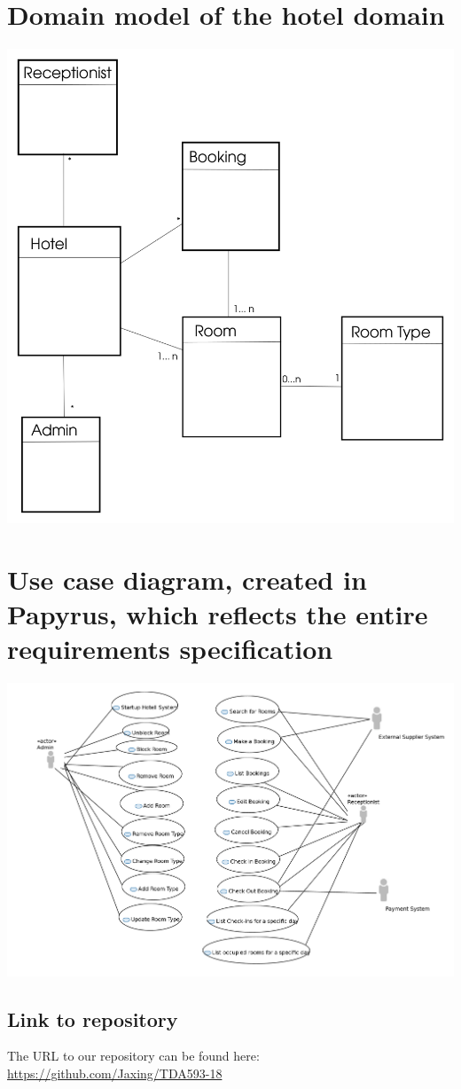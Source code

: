 \documentclass[utf8]{article}
\begin{document}
	\section{Domain model of the hotel domain}
	\includegraphics[scale=0.2]{ClassDiagram}
	\section{Use case diagram, created in Papyrus, which reflects the entire requirements specification}
	\includegraphics[scale=0.2]{use-case-diagram}
	\subsection{Link to repository}
	The URL to our repository can be found here:\\
	\url{https://github.com/Jaxing/TDA593-18}
\end{document}
